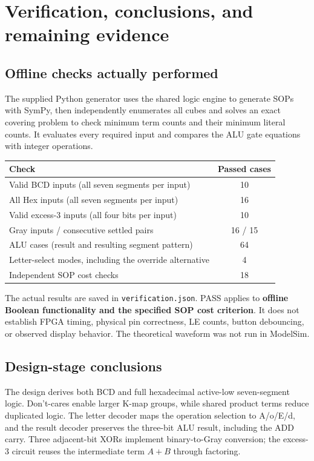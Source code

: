 \documentclass[a4paper,11pt]{article}
\begin{document}
\clearpage\section{Verification, conclusions, and remaining evidence}
\subsection{Offline checks actually performed}
The supplied Python generator uses the shared logic engine to generate SOPs with SymPy,
then independently enumerates all cubes and solves an exact covering problem to check
minimum term counts and their minimum literal counts. It evaluates every required
input and compares the ALU gate equations with integer operations.


\begin{center}\small
\begin{tabular}{lc}
\toprule
Check & Passed cases\\\midrule
Valid BCD inputs (all seven segments per input) & 10\\
All Hex inputs (all seven segments per input) & 16\\
Valid excess-3 inputs (all four bits per input) & 10\\
Gray inputs / consecutive settled pairs & 16 / 15\\
ALU cases (result and resulting segment pattern) & 64\\
Letter-select modes, including the override alternative & 4\\
Independent SOP cost checks & 18\\
\bottomrule\end{tabular}\end{center}


The actual results are saved in \texttt{verification.json}. PASS applies to
\textbf{offline Boolean functionality and the specified SOP cost criterion}. It does
not establish FPGA timing, physical pin correctness, LE counts, button debouncing,
or observed display behavior. The theoretical waveform was not run in ModelSim.
\subsection{Design-stage conclusions}
The design derives both BCD and full hexadecimal active-low seven-segment logic.
Don't-cares enable larger K-map groups, while shared product terms reduce duplicated
logic. The letter decoder maps the operation selection to A/o/E/d, and the result
decoder preserves the three-bit ALU result, including the ADD carry. Three adjacent-bit
XORs implement binary-to-Gray conversion; the excess-3 circuit reuses the intermediate
term $A+B$ through factoring.
\end{document}
